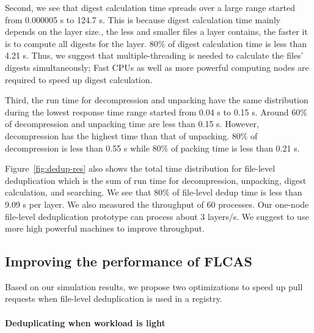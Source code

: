 Second, we see that digest calculation time spreads over a large range started
from 0.000005 s to 124.7 s. 
%
This is because digest calculation time mainly
depends on the layer size., \ie the less and smaller files a layer
contains, the faster it is to compute all digests for the layer.
%
%
%
80\% of digest calculation time is less than 4.21 s. 
%
Thus, we suggest that multiple-threading is needed to calculate the files'
digests simultaneously; 
%
Fast CPUs as well as more powerful computing nodes are
required to speed up digest calculation.

Third, the run time for decompression and unpacking have the same distribution
during the lowest response time range started from 0.04 s to 0.15 s. 
%
Around 60\% of decompression and unpacking time are less than 0.15 s. 
%
However, decompression has the highest time than that of unpacking. 
%
80\% of decompression is less than 0.55 s while 80\% of packing time is less than 0.21 s. 

Figure~\ref{fig:dedup-res} also shows the total time distribution for
file-level deduplication which is the sum of run time for decompression, unpacking,
digest calculation, and searching. 
%
We see that 80\% of file-level dedup time is
less than 9.09 s per layer.
%
%
We also measured the throughput of 60 processes. 
%
Our one-node file-level
deduplication prototype can process about 3 layers/s. 
%
We suggest to use more
high powerful machines to improve throughput.

 
%
\subsection{Improving the performance of FLCAS}

Based on our simulation results, we propose two optimizations
to speed up pull requests when file-level deduplication is used
in a registry.

\paragraph{Deduplicating when workload is light}


